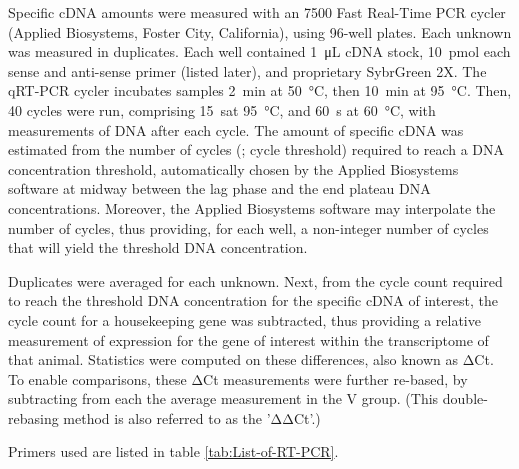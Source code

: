 \documentclass[12pt,english]{report}\usepackage[]{graphicx}\usepackage[]{color}
\begin{document}
Specific cDNA amounts were measured with an 7500 Fast Real-Time PCR
cycler (Applied Biosystems, Foster City, California), using 96-well
plates. Each unknown was measured in duplicates. Each well contained
\SI{1}{\micro\liter} cDNA stock, \SI{10}{\pico\mole} each sense
and anti-sense primer (listed later), and proprietary SybrGreen 2X.
The qRT-PCR cycler incubates samples \SI{2}{\minute} at \SI{50}{\celsius},
then \SI{10}{\minute} at \SI{95}{\celsius}. Then, 40 cycles were
run, comprising \SI{15}{\second}at \SI{95}{\celsius}, and \SI{60}{\second}
at \SI{60}{\celsius}, with measurements of DNA after each cycle.
The amount of specific cDNA was estimated from the number of cycles
(; cycle threshold) required to
reach a DNA concentration threshold, automatically chosen by the Applied
Biosystems software at midway between the lag phase and the end plateau
DNA concentrations. Moreover, the Applied Biosystems software may
interpolate the number of cycles, thus providing, for each well, a
non-integer number of cycles that will yield the threshold DNA concentration.

Duplicates were averaged for each unknown. Next, from the cycle count
required to reach the threshold DNA concentration for the specific
cDNA of interest, the cycle count for a housekeeping gene was subtracted,
thus providing a relative measurement of expression for the gene of
interest within the transcriptome of that animal. Statistics were
computed on these differences, also known as ΔCt. To enable comparisons,
these ΔCt measurements were further re-based, by subtracting from
each the average measurement in the V group. (This double-rebasing
method is also referred to as the 'ΔΔCt'.)

Primers used are listed in table \ref{tab:List-of-RT-PCR}.
\end{document}
